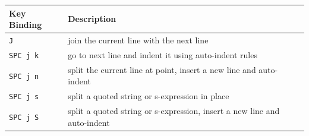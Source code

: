 \documentclass[11pt]{article}
\begin{document}
\begin{enumerate}
\begin{center}
\begin{tabular}{ll}
Key Binding & Description\\
\hline
\texttt{J} & join the current line with the next line\\
\texttt{SPC j k} & go to next line and indent it using auto-indent rules\\
\texttt{SPC j n} & split the current line at point, insert a new line and auto-indent\\
\texttt{SPC j s} & split a quoted string or s-expression in place\\
\texttt{SPC j S} & split a quoted string or s-expression, insert a new line and auto-indent\\
\end{tabular}
\end{center}
\end{enumerate}
\end{document}
